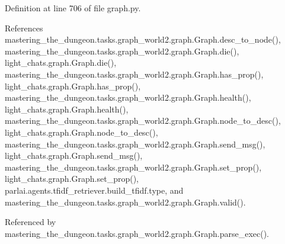 Definition at line 706 of file graph.\+py.



References mastering\+\_\+the\+\_\+dungeon.\+tasks.\+graph\+\_\+world2.\+graph.\+Graph.\+desc\+\_\+to\+\_\+node(), mastering\+\_\+the\+\_\+dungeon.\+tasks.\+graph\+\_\+world2.\+graph.\+Graph.\+die(), light\+\_\+chats.\+graph.\+Graph.\+die(), mastering\+\_\+the\+\_\+dungeon.\+tasks.\+graph\+\_\+world2.\+graph.\+Graph.\+has\+\_\+prop(), light\+\_\+chats.\+graph.\+Graph.\+has\+\_\+prop(), mastering\+\_\+the\+\_\+dungeon.\+tasks.\+graph\+\_\+world2.\+graph.\+Graph.\+health(), light\+\_\+chats.\+graph.\+Graph.\+health(), mastering\+\_\+the\+\_\+dungeon.\+tasks.\+graph\+\_\+world2.\+graph.\+Graph.\+node\+\_\+to\+\_\+desc(), light\+\_\+chats.\+graph.\+Graph.\+node\+\_\+to\+\_\+desc(), mastering\+\_\+the\+\_\+dungeon.\+tasks.\+graph\+\_\+world2.\+graph.\+Graph.\+send\+\_\+msg(), light\+\_\+chats.\+graph.\+Graph.\+send\+\_\+msg(), mastering\+\_\+the\+\_\+dungeon.\+tasks.\+graph\+\_\+world2.\+graph.\+Graph.\+set\+\_\+prop(), light\+\_\+chats.\+graph.\+Graph.\+set\+\_\+prop(), parlai.\+agents.\+tfidf\+\_\+retriever.\+build\+\_\+tfidf.\+type, and mastering\+\_\+the\+\_\+dungeon.\+tasks.\+graph\+\_\+world2.\+graph.\+Graph.\+valid().



Referenced by mastering\+\_\+the\+\_\+dungeon.\+tasks.\+graph\+\_\+world2.\+graph.\+Graph.\+parse\+\_\+exec().

